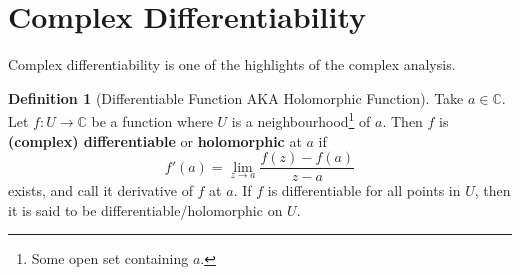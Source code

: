 \documentclass[a4paper, 12pt]{article}
\theoremstyle{definition}
\newtheorem{definition}{Definition}
\numberwithin{definition}{section}
\numberwithin{exercise}{section}
\numberwithin{remark}{section}
\numberwithin{figure}{section}
\newcommand{\C}{\mathbb{C}}
\begin{document}
\section{Complex Differentiability}
Complex differentiability is one of the highlights of the complex analysis.
\begin{definition}[Differentiable Function AKA Holomorphic Function]
    Take $a \in \C$.
    Let $f:U \rightarrow \C$ be a function where $U$ is a neighbourhood\footnote{Some open set containing $a$.} of $a$.
    Then $f$ is \textbf{(complex) differentiable} or \textbf{holomorphic} at $a$ if
    \begin{equation*}
        f'(a) = \lim_{z \rightarrow a} \frac{f(z) - f(a)}{z - a}
    \end{equation*}
    exists, and call it derivative of $f$ at $a$.
    If $f$ is differentiable for all points in $U$, then it is said to be
    differentiable/holomorphic on $U$.
\end{definition}
\end{document}
